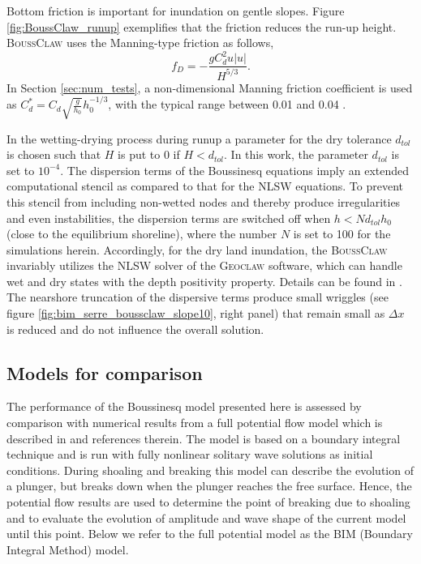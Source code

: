 \documentclass[review]{elsarticle}
\newcommand{\BoussClaw}{\textsc{BoussClaw} }
\begin{document}
Bottom friction is important for inundation on gentle slopes. 
Figure \ref{fig:BoussClaw_runup} 
exemplifies that the friction reduces the run-up height.
\BoussClaw uses the Manning-type friction as follows,
\begin{equation}
\label{eq:Manning}
f_D = -\frac{g C_d^2 u |u|}{H^{5/3}}.
\end{equation}
In Section \ref{sec:num_tests}, a non-dimensional Manning friction
coefficient is used as $C_d^* = C_d \sqrt{\frac{g}{h_0}} h_0^{-1/3}$,
with the typical range between 0.01 and 0.04 \citep{te1959open}.


In the wetting-drying process during runup a parameter 
for the dry tolerance $d_{tol}$ is chosen
such that $H$ is put to $0$ if $H<d_{tol}$.
In this work, the parameter $d_{tol}$ is set to $10^{-4}$. 
The dispersion terms of the Boussinesq equations imply an extended computational
stencil as compared to that for the NLSW equations. To prevent this stencil 
from including non-wetted nodes and thereby produce irregularities and even instabilities, the dispersion terms are switched off when $h<Nd_{tol}h_0$ (close to the equilibrium shoreline), where the number $N$ is set to 100 for the simulations herein.
Accordingly, for the dry land inundation, the \BoussClaw invariably
utilizes the NLSW solver of the \textsc{Geoclaw} software,
which can handle 
wet and dry states with the depth positivity property.
Details can be found in \cite{george2008augmented}.
The nearshore truncation of the dispersive terms produce small wriggles (see figure \ref{fig:bim_serre_boussclaw_slope10}, right panel) that remain small as $\Delta x$ is 
reduced and do not influence the overall solution. 


\subsection{Models for comparison}
The performance of the Boussinesq model presented here is 
assessed by comparison with numerical results from a full potential
flow model which is described in \citet{Lovholt:2013a} and references therein. The model is based on a boundary 
integral technique and is run  with fully nonlinear solitary
wave solutions as initial conditions. During shoaling and breaking this
model can describe the evolution of a plunger, but breaks down
when the plunger reaches the free surface. Hence, the potential flow 
results are used to determine the point of breaking due to shoaling 
and to
evaluate the evolution of  amplitude and wave 
shape of the current model until this point.   
Below we refer to the full potential model as the BIM (Boundary
 Integral Method) model.
\end{document}
